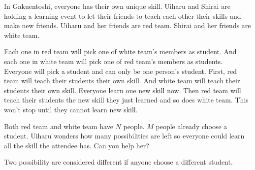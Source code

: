 In Gakuentoshi, everyone has their own unique skill. 
Uiharu and Shirai are holding a learning event to 
let their friends to teach each other their skills 
and make new friends. Uiharu and her friends are red team. 
Shirai and her friends are white team.

Each one in red team will pick one of white team's members as student. 
And each one in white team will pick one of red team's members as students. 
Everyone will pick a student and can only be one person’s student. 
First, red team will teach their students their own skill. 
And white team will teach their students their own skill. 
Everyone learn one new skill now. 
Then red team will teach their students the new skill they just learned and 
so does white team. 
This won't stop until they cannot learn new skill.

Both red team and white team have $N$ people. 
$M$ people already choose a student.
Uiharu wonders how many possibilities are left so everyone could 
learn all the skill the attendee has. Can you help her?

Two possibility are considered different if anyone choose a different student.
